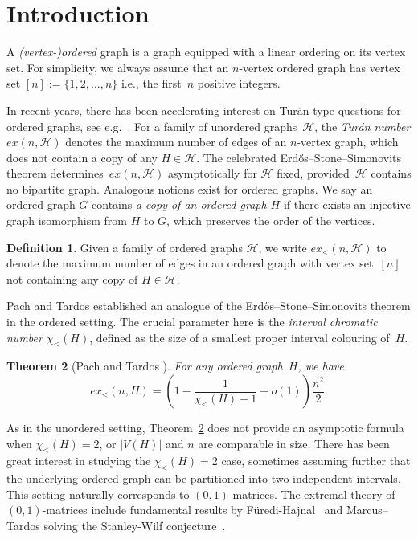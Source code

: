 \documentclass[11pt]{article}
\newtheorem{theorem}{Theorem}[section]
\theoremstyle{definition}
\newtheorem{define}[theorem]{Definition}
\begin{document}
\section{Introduction}

A {\it (vertex-)ordered} graph is a graph equipped with a linear ordering on its vertex set.
For simplicity, we always assume that an $n$-vertex ordered graph has vertex set $[n]:=\{1,2,\dots,n\}$ i.e., the first~$n$ positive integers.

In recent years, there has been accelerating interest on Tur\'an-type questions for ordered graphs, see e.g.~\cite{tardos}.
For a family of unordered graphs~$\mathcal H$, the {\it Tur\'an number} $ex(n,{\mathcal H})$ denotes the maximum number of edges of an $n$-vertex graph, which does not contain a copy of any $H\in {\mathcal H}$.
The celebrated Erd\H os--Stone--Simonovits theorem determines~$ex({n,\mathcal H})$ asymptotically for $\mathcal H$ fixed, provided~$\mathcal H$ contains no bipartite graph.
Analogous notions exist for ordered graphs.
We say an ordered graph $G$ contains {\it a copy of an ordered graph $H$} if there exists an injective graph isomorphism from $H$ to $G$, which preserves the order of the vertices.

\begin{define}
Given a family of ordered graphs $\mathcal H$, we write $ex_<(n,\mathcal H)$ to denote the maximum number of edges in an ordered graph with vertex set~$[n]$ not containing any copy of $H\in\mathcal H$.
\end{define}

Pach and Tardos established an analogue of the Erd\H os--Stone--Simonovits theorem in the ordered setting.
The crucial parameter here is the {\it interval chromatic number $\chi_<(H)$}, defined as the size of a smallest proper interval colouring of~$H$.

\begin{theorem}[Pach and Tardos \cite{PT06}]\label{thm:PachTardos}
For any ordered graph~$H$, we have
    $$ex_<(n,H)=\left(1-\frac{1}{\chi_<(H)-1}+o(1)\right)\frac{n^2}{2}.$$
\end{theorem}

As in the unordered setting, Theorem~\ref{thm:PachTardos} does not provide an asymptotic formula when $\chi_<(H)=2$, or $|V(H)|$ and $n$ are comparable in size.
There has been great interest in studying the $\chi_<(H)=2$ case, sometimes assuming further that the underlying ordered graph can be partitioned into two independent intervals. 
This setting naturally corresponds to $(0,1)$-matrices.
The extremal theory of $(0,1)$-matrices include fundamental results by Füredi-Hajnal~\cite{fh}
and Marcus--Tardos solving the Stanley-Wilf conjecture~\cite{mt}.
\end{document}
